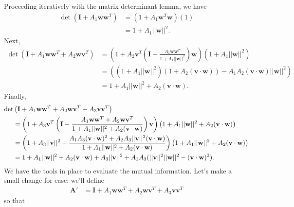 \documentclass[11pt]{article}
\begin{document}
Proceeding iteratively with the matrix determinant lemma, we have
\begin{align}
	\det (\mathbf{I} + A_1 \mathbf{ww}^T) &= (1 + A_1 \mathbf{w}^T \mathbf{w}) (1) \\
	&= 1  + A_1 ||\mathbf{w}||^2.
\end{align}
Next,
\begin{align}
	\det (\mathbf{I} + A_1 \mathbf{ww}^T + A_2 \mathbf{wv}^T) &= \left(1 + A_2\mathbf{v}^T  \left( \mathbf{I} - \frac{A_1 \mathbf{ww}^T}{1 + A_1 ||\mathbf{w}||^2}\right) \mathbf{w}\right) (1 + A_1 ||\mathbf{w}||^2) \\
	&= \left((1  +A_1 ||\mathbf{w}||^2)(1 + A_2 (\mathbf{v}\cdot\mathbf{w})) - A_1 A_2 (\mathbf{v}\cdot\mathbf{w}) ||\mathbf{w}||^2\right) \\
	&= 1 + A_1 ||\mathbf{w}||^2 + A_2 (\mathbf{v}\cdot\mathbf{w}).
\end{align}
Finally,
\begin{align}
	\det &\left(\mathbf{I}+ A_1 \mathbf{ww}^T + A_2 \mathbf{wv}^T + A_3 \mathbf{vv}^T\right) \notag \\
	&=\left(1 + A_3 \mathbf{v}^T \left(\mathbf{I} - \frac{A_1 \mathbf{ww}^T + A_2 \mathbf{wv}^T}{1 + A_1 ||\mathbf{w}||^2 + A_2 (\mathbf{v}\cdot\mathbf{w})}\right)\mathbf{v}\right)\left(1 + A_1 ||\mathbf{w}||^2 + A_2 (\mathbf{v}\cdot\mathbf{w})\right) \\
	& =\left(1 + A_3 ||\mathbf{v}||^2 - \frac{A_1 A_3 (\mathbf{v}\cdot\mathbf{w})^2 + A_2 A_3 ||\mathbf{v}||^2 (\mathbf{v}\cdot\mathbf{w})}{1 + A_1 ||\mathbf{w}||^2 + A_2 (\mathbf{v}\cdot\mathbf{w})}\right)\left(1 + A_1 ||\mathbf{w}||^2 + A_2 (\mathbf{v}\cdot\mathbf{w})\right)\\
	&= 1 + A_1 ||\mathbf{w}||^2 + A_2 (\mathbf{v}\cdot\mathbf{w}) + A_3 ||\mathbf{v}||^2 + A_1 A_3 (||\mathbf{v}||^2 ||\mathbf{w}||^2 - (\mathbf{v}\cdot\mathbf{w})^2).
\end{align}
We have the tools in place to evaluate the mutual information. Let's make a small change for ease: we'll define
\begin{align}
	\mathbf{A}' &= \mathbf{I} + A_1 \mathbf{ww}^T + A_2 \mathbf{wv}^T + A_3 \mathbf{vv}^T
\end{align}
so that
\end{document}

